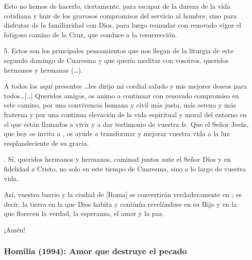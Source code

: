 \begin{body}
Esto no hemos de hacerlo, ciertamente, para escapar de la dureza de la vida cotidiana y huir de los gravosos compromisos del servicio al hombre, sino para disfrutar de la familiaridad con Dios, para luego reanudar con renovado vigor el fatigoso camino de la Cruz, que conduce a la resurrección.

5. Estos son los principales pensamientos que nos llegan de la liturgia de este segundo domingo de Cuaresma y que quería meditar con vosotros, queridos hermanos y hermanas (\ldots).

A todos los aquí presentes \ldots les dirijo mi cordial saludo y mis mejores deseos para todos\ldots [\ldots] Queridos amigos, os animo a continuar con renovado compromiso en este camino, por una convivencia humana y civil más justa, más serena y más fraterna y por una continua elevación de la vida espiritual y moral del entorno en el que están llamados a vivir y a dar testimonio de vuestra fe. Que el Señor Jesús, que hoy os invita a , os ayude a transformar y mejorar vuestra vida a la luz resplandeciente de su gracia.

. Sí, queridos hermanos y hermanas, caminad juntos ante el Señor Dios y en fidelidad a Cristo, no solo en este tiempo de Cuaresma, sino a lo largo de vuestra vida.

Así, vuestro barrio y la ciudad de [Roma] se convertirán verdaderamente en ; es decir, la tierra en la que Dios habita y continúa revelándose en su Hijo y en la que florecen la verdad, la esperanza, el amor y la paz.

¡Amén!
\end{body}

\label{b2-03-02-1991H}

\subsubsection{Homilía (1994): Amor que destruye el pecado}


